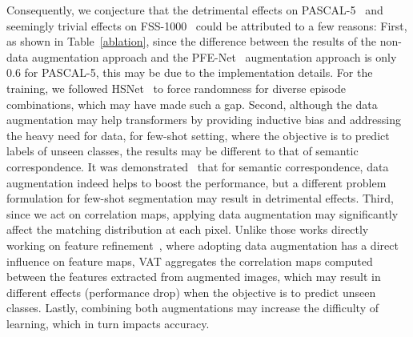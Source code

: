 Consequently, we conjecture that the detrimental effects on PASCAL-5~\cite{shaban2017one} and seemingly trivial effects on FSS-1000~\cite{li2020fss} could be attributed to a few reasons: First, as shown in Table~\ref{ablation}, since the difference between the results of the non-data augmentation approach and the PFE-Net~\cite{tian2020prior} augmentation approach is only 0.6 for PASCAL-5, this may be due to the implementation details. For the training, we followed HSNet~\cite{min2021hypercorrelation} to force randomness for diverse episode combinations, which may have made such a gap. Second, although the data augmentation may help transformers by providing inductive bias and addressing the heavy need for data, for few-shot setting, where the objective is to predict labels of unseen classes, the results may be different to that of semantic correspondence. It was demonstrated~\cite{cho2021semantic} that for semantic correspondence, data augmentation indeed helps to boost the performance, but a different problem formulation for few-shot segmentation may result in detrimental effects. Third, since we act on correlation maps, applying data augmentation may significantly affect the matching distribution at each pixel. Unlike those works directly working on feature refinement~\cite{tian2020prior,zhang2021few}, where adopting data augmentation has a direct influence on feature maps, VAT aggregates the correlation maps computed between the features extracted from augmented images, which may result in different effects (performance drop) when the objective is to predict unseen classes. Lastly, combining both augmentations may increase the difficulty of learning, which in turn impacts accuracy.\vspace{-10pt}







